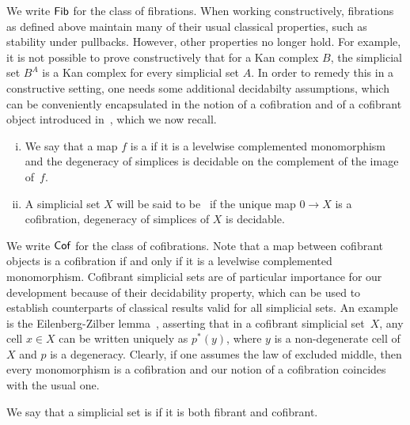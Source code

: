 \documentclass[reqno,10pt,a4paper,oneside,draft]{amsart}
\begin{document}
We write $\mathsf{Fib}$ for the class of fibrations. 
When working constructively, fibrations as defined above maintain many of their usual classical properties,
such as stability under pullbacks. However, other properties no longer hold. For example, it is not possible to prove constructively that
for a Kan complex $B$, the simplicial set $B^A$ is a Kan complex for every simplicial set $A$. In order
to remedy this in a constructive setting, one needs some additional decidabilty assumptions, which can be 
conveniently encapsulated in the notion of a cofibration and of a cofibrant object introduced in~\cite[\S 5.1.7]{henry2018wms}, which we now recall. 




\begin{definition} \hfill
\begin{enumerate}[(i)] 
\item We say that  a map $f$ is a  if it is a levelwise complemented monomorphism and the degeneracy of simplices is decidable on the complement of the image of~$f$. 
\item A simplicial set $X$ will be said to be~ if the unique map $0 \to X$ is a cofibration, 
\ie degeneracy of simplices of $X$ is decidable.
\end{enumerate}
\end{definition}

\medskip



We write $\mathsf{Cof}$ for the class of cofibrations.  Note that a map between cofibrant objects is a cofibration
if and only if it is a levelwise complemented monomorphism. 
Cofibrant simplicial sets are of particular importance for our development because of their decidability property, which can be used to establish counterparts of classical results valid for all simplicial sets. An example is the Eilenberg-Zilber lemma~\cite{henry2018wms}, asserting that in a cofibrant simplicial set~$X$, any cell $x \in X$ can be written uniquely as $p^*(y)$, where $y$ is a non-degenerate cell of $X$ and $p$ is a degeneracy. Clearly, if one assumes the law of excluded middle, then every monomorphism is a cofibration and our notion of a cofibration coincides with the usual one. 

\medskip



We say that a simplicial set is  if it is both fibrant and cofibrant. 

\medskip
\end{document}
